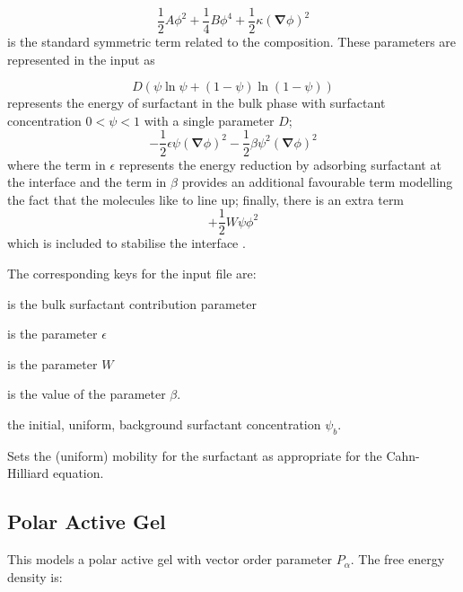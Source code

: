 \begin{equation}
{\textstyle \frac{1}{2}}A\phi^2
+ {\textstyle \frac{1}{4}}B\phi^4
+ {\textstyle \frac{1}{2}}\kappa (\mathbf{\nabla}\phi)^2
\end{equation}
is the standard symmetric term related to the composition.
These parameters are represented in the input as


\begin{equation}
D \left(\psi \ln\psi + (1 - \psi) \ln(1-\psi)\right)
\end{equation}
represents the energy of surfactant in the bulk phase with surfactant
concentration $0 < \psi < 1$ with a single parameter $D$;
\begin{equation}
-{\textstyle \frac{1}{2}} \epsilon \psi (\mathbf{\nabla} \phi)^2
-{\textstyle \frac{1}{2}} \beta \psi^2  (\mathbf{\nabla} \phi)^2
\end{equation}
where the term in $\epsilon$ represents the energy reduction by
adsorbing surfactant at the interface and the term in $\beta$
provides an additional favourable term modelling the fact that
the molecules like to line up; finally, there is an extra term
\begin{equation}
+{\textstyle \frac{1}{2}} W \psi \phi^2
\end{equation}
which is included to stabilise the interface \cite{theissengompper}.

The corresponding keys for the input file are:

 is the bulk surfactant contribution parameter

 is the parameter $\epsilon$

 is the parameter $W$

 is the value of the parameter $\beta$.

 the initial, uniform, background surfactant
concentration $\psi_b$.

 Sets the (uniform) mobility for the surfactant
as appropriate for the Cahn-Hilliard equation.


\subsection{Polar Active Gel}


This models a polar active gel with vector order parameter $P_\alpha$.
The free energy density is:


